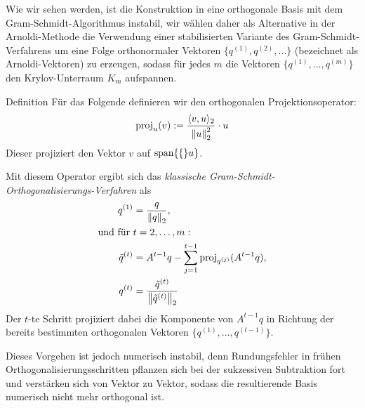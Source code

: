 Wie wir sehen werden, ist die Konstruktion in eine orthogonale Basis mit dem Gram-Schmidt-Algorithmus instabil, 
wir wählen daher als Alternative in der Arnoldi-Methode die Verwendung einer stabilisierten Variante des 
Gram-Schmidt-Verfahrens um eine Folge orthonormaler Vektoren $\{q^{(1)},q^{(2)},\dots\}$ (bezeichnet als 
Arnoldi-Vektoren) zu erzeugen, sodass für jedes $m$ die Vektoren $\{q^{(1)},\dots,q^{(m)}\}$ den Krylov-Unterraum $K_m$ 
aufspannen. 

\begin{colbox}{Definition}
Für das Folgende definieren wir den orthogonalen Projektionsoperator:
%
\begin{align*}
  \text{proj}_u(v) 
  := \dfrac{\langle v,u\rangle_2}{\vertn{2}{u}_2^2}\cdot u
\end{align*}
%
Dieser projiziert den Vektor $v$ auf $\text{span}\{\{\}u\}$.
\end{colbox}

Mit diesem Operator ergibt sich das \textit{klassische Gram-Schmidt-Orthogonalisierungs-Verfahren} als 
%
\begin{align*}
  q^{(1)} 
  &= \dfrac{q}{\vertn{2}{q}_2}, \\
  \text{und für } &t=2,\dots,m: \\
  \tilde{q}^{(t)} 
  &= A^{t-1}q - \sum_{j=1}^{t-1} \text{proj}_{q^{(j)}}(A^{t-1}q), 
  \\
  q^{(t)} 
  &= \dfrac{\tilde{q}^{(t)}}{\vertn{2}{\tilde{q}^{(t)}}_2}
\end{align*}
%
Der $t$-te Schritt projiziert dabei die Komponente von $A^{t-1}q$ in Richtung der bereits bestimmten orthogonalen 
Vektoren $\{q^{(1)},\dots,q^{(t-1)}\}$. 

Dieses Vorgehen ist jedoch numerisch instabil, denn Rundungsfehler in frühen Orthogonalisierungsschritten 
pflanzen sich bei der sukzessiven Subtraktion fort und verstärken sich von Vektor zu Vektor, 
sodass die resultierende Basis numerisch nicht mehr orthogonal ist. 

